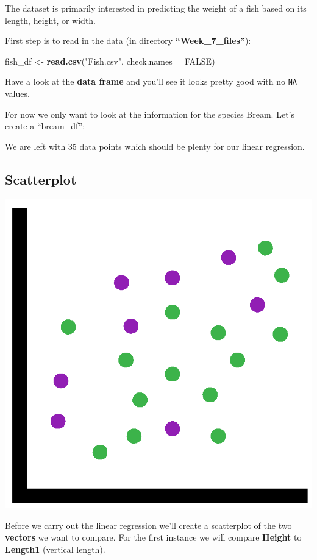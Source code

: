 \documentclass[]{book}
\newenvironment{Shaded}{\begin{snugshade}}{\end{snugshade}}
\newcommand{\KeywordTok}[1]{\textcolor[rgb]{0.13,0.29,0.53}{\textbf{#1}}}
\newcommand{\DataTypeTok}[1]{\textcolor[rgb]{0.13,0.29,0.53}{#1}}
\newcommand{\StringTok}[1]{\textcolor[rgb]{0.31,0.60,0.02}{#1}}
\newcommand{\CommentTok}[1]{\textcolor[rgb]{0.56,0.35,0.01}{\textit{#1}}}
\newcommand{\OtherTok}[1]{\textcolor[rgb]{0.56,0.35,0.01}{#1}}
\newcommand{\OperatorTok}[1]{\textcolor[rgb]{0.81,0.36,0.00}{\textbf{#1}}}
\newcommand{\NormalTok}[1]{#1}
\begin{document}
The dataset is primarily interested in predicting the weight of a fish
based on its length, height, or width.

First step is to read in the data (in directory
\textbf{``Week\_7\_files''}):

\begin{Shaded}
\begin{Highlighting}[]
\NormalTok{fish_df <-}\StringTok{ }\KeywordTok{read.csv}\NormalTok{(}\StringTok{"Fish.csv"}\NormalTok{, }\DataTypeTok{check.names =} \OtherTok{FALSE}\NormalTok{)}
\end{Highlighting}
\end{Shaded}

Have a look at the \textbf{data frame} and you'll see it looks pretty
good with no \texttt{NA} values.

For now we only want to look at the information for the species Bream.
Let's create a ``bream\_df'':

\begin{Shaded}
\end{Shaded}

We are left with 35 data points which should be plenty for our linear
regression.

\subsection{Scatterplot}\label{scatterplot}

\begin{center}\includegraphics[width=0.2\linewidth]{figures/Scatterplot_2} \end{center}

Before we carry out the linear regression we'll create a scatterplot of
the two \textbf{vectors} we want to compare. For the first instance we
will compare \textbf{Height} to \textbf{Length1} (vertical length).
\end{document}
